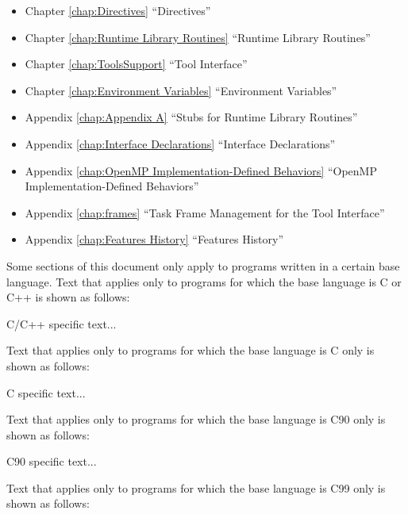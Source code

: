 \begin{itemize}
\item Chapter \ref{chap:Directives} ``Directives''

\item Chapter \ref{chap:Runtime Library Routines} ``Runtime Library Routines''

\item Chapter \ref{chap:ToolsSupport} ``Tool Interface''

\item Chapter \ref{chap:Environment Variables} ``Environment Variables''

\item Appendix \ref{chap:Appendix A} ``Stubs for Runtime Library Routines''

\item Appendix \ref{chap:Interface Declarations} ``Interface Declarations'' 

\item Appendix \ref{chap:OpenMP Implementation-Defined Behaviors} ``OpenMP Implementation-Defined Behaviors''

\item Appendix \ref{chap:frames} ``Task Frame Management for the Tool Interface''

\item Appendix \ref{chap:Features History} ``Features History''
\end{itemize}

Some sections of this document only apply to programs written in a certain base 
language. Text that applies only to programs for which the base language is C or C++ is shown 
as follows: 

\begin{ccppspecific}
C/C++ specific text...
\end{ccppspecific}

Text that applies only to programs for which the base language is C only is shown as follows:

\begin{cspecific}
C specific text...
\end{cspecific}

Text that applies only to programs for which the base language is C90 only is shown as 
follows:

\begin{c90specific}
C90 specific text...
\end{c90specific}

Text that applies only to programs for which the base language is C99 only is shown as 
follows:

